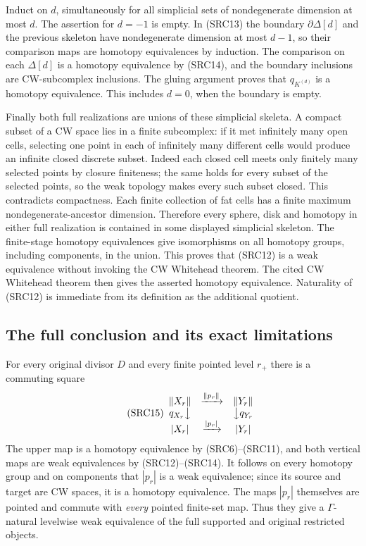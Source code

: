 Induct on $d$, simultaneously for all simplicial sets of
nondegenerate dimension at most $d$. The assertion for $d=-1$
is empty. In (SRC13) the boundary $\partial\Delta[d]$ and the
previous skeleton have nondegenerate dimension at most $d-1$,
so their comparison maps are homotopy equivalences by induction.
The comparison on each $\Delta[d]$ is a homotopy equivalence by
(SRC14), and the boundary inclusions are CW-subcomplex inclusions.
The gluing argument proves that $q_{K^{(d)}}$ is a homotopy
equivalence. This includes $d=0$, when the boundary is empty.

Finally both full realizations are unions of these simplicial
skeleta. A compact subset of a CW space lies in a finite
subcomplex: if it met infinitely many open cells, selecting one
point in each of infinitely many different cells would produce
an infinite closed discrete subset. Indeed each closed cell meets
only finitely many selected points by closure finiteness; the
same holds for every subset of the selected points, so the weak
topology makes every such subset closed. This contradicts
compactness. Each finite collection of fat cells has a finite
maximum nondegenerate-ancestor dimension. Therefore every sphere,
disk and homotopy in either full realization is contained in
some displayed simplicial skeleton. The finite-stage homotopy
equivalences give isomorphisms on all homotopy groups, including
components, in the union. This proves that (SRC12) is a weak
equivalence without invoking the CW Whitehead theorem. The cited
CW Whitehead theorem then gives the asserted
homotopy equivalence. Naturality of (SRC12) is immediate from its
definition as the additional quotient.

\subsection{The full conclusion and its exact limitations}

For every original divisor $D$ and every finite pointed level $r_+$
there is a commuting square
\begin{equation}\tag{SRC15}
\begin{array}{ccc}
\|X_r\| &\xrightarrow{\|p_r\|}& \|Y_r\|\\
q_{X_r}\big\downarrow&&\big\downarrow q_{Y_r}\\
|X_r| &\xrightarrow{|p_r|}& |Y_r|
\end{array}
\end{equation}
The upper map is a homotopy equivalence by (SRC6)--(SRC11), and
both vertical maps are weak equivalences by (SRC12)--(SRC14).
It follows on every homotopy group and on components that
$|p_r|$ is a weak equivalence; since its source and target are
CW spaces, it is a homotopy equivalence. The maps $|p_r|$ themselves
are pointed and commute with \emph{every} pointed finite-set map.
Thus they give a $\Gamma$-natural levelwise weak equivalence of
the full supported and original restricted objects.

